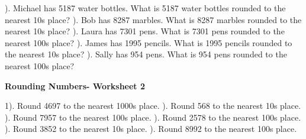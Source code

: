 \documentclass{article}%
\begin{document}
\newline%
). Michael has 5187 water bottles. What is 5187 water bottles rounded to the nearest 10s place?%
\newline%
\newline%
). Bob has 8287 marbles. What is 8287 marbles rounded to the nearest 10s place?%
\newline%
\newline%
). Laura has 7301 pens. What is 7301 pens rounded to the nearest 100s place?%
\newline%
\newline%
). James has 1995 pencils. What is 1995 pencils rounded to the nearest 10s place?%
\newline%
\newline%
). Sally has 954 pens. What is 954 pens rounded to the nearest 100s place?%
\newline%
\newline%
\newline%
\pagebreak%
\large%
\begin{center}%
\textbf{Rounding Numbers- Worksheet 2}%
\newline%
\end{center} \normalsize%
1). Round 4697 to the nearest 1000s place.%
\newline%
\newline%
). Round 568 to the nearest 10s place.%
\newline%
\newline%
). Round 7957 to the nearest 100s place.%
\newline%
\newline%
). Round 2578 to the nearest 100s place.%
\newline%
\newline%
). Round 3852 to the nearest 10s place.%
\newline%
\newline%
). Round 8992 to the nearest 100s place.%
\newline%
\newline%
\end{document}
